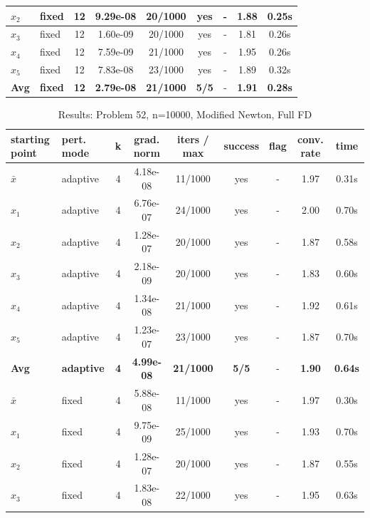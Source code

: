 \begin{longtable}{|l|l|c|c|c|c|c|c|c|}
\hline
$x_2$ & fixed & 12 & 9.29e-08 & 20/1000 & yes & - & 1.88 & 0.25s \\
\hline
$x_3$ & fixed & 12 & 1.60e-09 & 20/1000 & yes & - & 1.81 & 0.26s \\
\hline
$x_4$ & fixed & 12 & 7.59e-09 & 21/1000 & yes & - & 1.95 & 0.26s \\
\hline
$x_5$ & fixed & 12 & 7.83e-08 & 23/1000 & yes & - & 1.89 & 0.32s \\
\hline
\hline\hline
\textbf{Avg} & \textbf{fixed} & \textbf{12} & \textbf{2.79e-08} & \textbf{21/1000} & \textbf{5/5} & - & \textbf{1.91} & \textbf{0.28s} \\
\hline\hline
\end{longtable}


\begin{longtable}{|l|l|c|c|c|c|c|c|c|}
\caption{Results: Problem 52, n=10000, Modified Newton, Full FD} \\
\hline
\textbf{starting point} & \textbf{pert. mode} & \textbf{k} & \textbf{grad. norm} & \textbf{iters / max} & \textbf{success} & \textbf{flag} & \textbf{conv. rate} & \textbf{time} \\
\hline
\endfirsthead
\endhead
\endfoot
\hline
\endlastfoot
$\bar{x}$ & adaptive & 4 & 4.18e-08 & 11/1000 & yes & - & 1.97 & 0.31s \\
\hline
$x_1$ & adaptive & 4 & 6.76e-07 & 24/1000 & yes & - & 2.00 & 0.70s \\
\hline
$x_2$ & adaptive & 4 & 1.28e-07 & 20/1000 & yes & - & 1.87 & 0.58s \\
\hline
$x_3$ & adaptive & 4 & 2.18e-09 & 20/1000 & yes & - & 1.83 & 0.60s \\
\hline
$x_4$ & adaptive & 4 & 1.34e-08 & 21/1000 & yes & - & 1.92 & 0.61s \\
\hline
$x_5$ & adaptive & 4 & 1.23e-07 & 23/1000 & yes & - & 1.87 & 0.70s \\
\hline
\hline\hline
\textbf{Avg} & \textbf{adaptive} & \textbf{4} & \textbf{4.99e-08} & \textbf{21/1000} & \textbf{5/5} & - & \textbf{1.90} & \textbf{0.64s} \\
\hline\hline
\hline
$\bar{x}$ & fixed & 4 & 5.88e-08 & 11/1000 & yes & - & 1.97 & 0.30s \\
\hline
$x_1$ & fixed & 4 & 9.75e-09 & 25/1000 & yes & - & 1.93 & 0.70s \\
\hline
$x_2$ & fixed & 4 & 1.28e-07 & 20/1000 & yes & - & 1.87 & 0.55s \\
\hline
$x_3$ & fixed & 4 & 1.83e-08 & 22/1000 & yes & - & 1.95 & 0.63s \\

\end{longtable}

